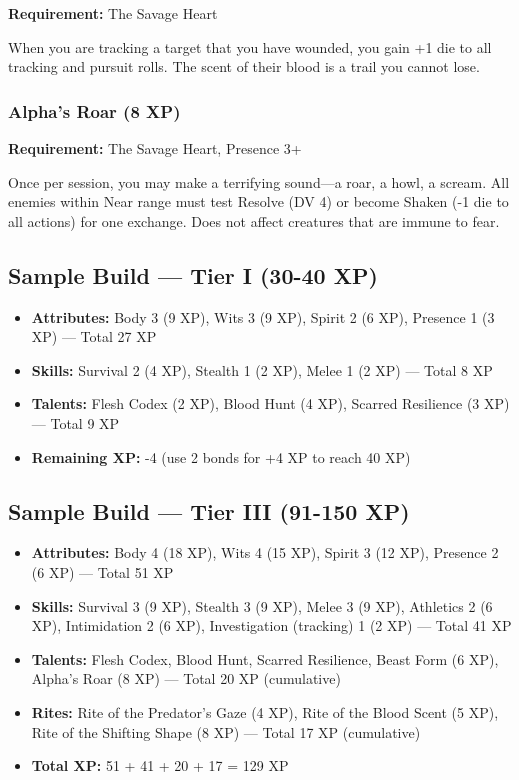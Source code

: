 \textbf{Requirement:} The Savage Heart

When you are tracking a target that you have wounded, you gain +1 die to all tracking and pursuit rolls. The scent of their blood is a trail you cannot lose.

\subsubsection{Alpha's Roar (8 XP)}

\textbf{Requirement:} The Savage Heart, Presence 3+

Once per session, you may make a terrifying sound—a roar, a howl, a scream. All enemies within Near range must test Resolve (DV 4) or become Shaken (-1 die to all actions) for one exchange. Does not affect creatures that are immune to fear.

\subsection{Sample Build — Tier I (30-40 XP)}

\begin{itemize}
\item \textbf{Attributes:} Body 3 (9 XP), Wits 3 (9 XP), Spirit 2 (6 XP), Presence 1 (3 XP) — Total 27 XP
\item \textbf{Skills:} Survival 2 (4 XP), Stealth 1 (2 XP), Melee 1 (2 XP) — Total 8 XP
\item \textbf{Talents:} Flesh Codex (2 XP), Blood Hunt (4 XP), Scarred Resilience (3 XP) — Total 9 XP
\item \textbf{Remaining XP:} -4 (use 2 bonds for +4 XP to reach 40 XP)
\end{itemize}

\subsection{Sample Build — Tier III (91-150 XP)}

\begin{itemize}
\item \textbf{Attributes:} Body 4 (18 XP), Wits 4 (15 XP), Spirit 3 (12 XP), Presence 2 (6 XP) — Total 51 XP
\item \textbf{Skills:} Survival 3 (9 XP), Stealth 3 (9 XP), Melee 3 (9 XP), Athletics 2 (6 XP), Intimidation 2 (6 XP), Investigation (tracking) 1 (2 XP) — Total 41 XP
\item \textbf{Talents:} Flesh Codex, Blood Hunt, Scarred Resilience, Beast Form (6 XP), Alpha's Roar (8 XP) — Total 20 XP (cumulative)
\item \textbf{Rites:} Rite of the Predator's Gaze (4 XP), Rite of the Blood Scent (5 XP), Rite of the Shifting Shape (8 XP) — Total 17 XP (cumulative)
\item \textbf{Total XP:} 51 + 41 + 20 + 17 = 129 XP
\end{itemize}

